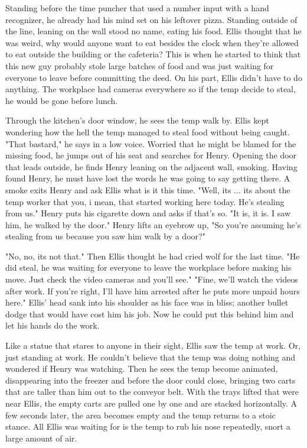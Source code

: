\begin{Document}
        Standing before the time puncher that used a number input with a hand recognizer, he already had his mind set on his leftover pizza. Standing outside of
    the line, leaning on the wall stood no name, eating his food. Ellis thought that he was weird, why would anyone want to eat besides the clock when they're
    allowed to eat outside the building or the cafeteria? This is when he started to think that this new guy probably stole large batches of food and was just
    waiting for everyone to leave before committing the deed. On his part, Ellis didn't have to do anything. The workplace had cameras everywhere so if the
    temp decide to steal, he would be gone before lunch.

        Through the kitchen's door window, he sees the temp walk by. Ellis kept wondering how the hell the temp managed to steal food without being caught. "That
    bastard," he says in a low voice. Worried that he might be blamed for the missing food, he jumps out of his seat and searches for Henry. Opening the door
    that leads outside, he finds Henry leaning on the adjacent wall, smoking. Having found Henry, he must have lost the words he was going to say getting there.
    A smoke exits Henry and ask Ellis what is it this time. "Well, its ... its about the temp worker that you, i mean, that started working here today. He's
    stealing from us." Henry puts his cigarette down and asks if that's so. "It is, it is. I saw him, he walked by the door." Henry lifts an eyebrow up, "So
    you're assuming he's stealing from us because you saw him walk by a door?"

        "No, no, its not that." Then Ellis thought he had cried wolf for the last time. "He did steal, he was waiting for everyone to leave the workplace before
    making his move. Just check the video cameras and you'll see." "Fine, we'll watch the videos after work. If you're right, I'll have him arrested after he
    puts more unpaid hours here." Ellis' head sank into his shoulder as his face was in bliss; another bullet dodge that would have cost him his job. Now he
    could put this behind him and let his hands do the work.

       Like a statue that stares to anyone in their sight, Ellis saw the temp at work. Or, just standing at work. He couldn't believe that the temp was doing
    nothing and wondered if Henry was watching. Then he sees the temp become animated, disappearing into the freezer and before the door could close, bringing
    two carts that are taller than him out to the conveyor belt. With the trays lifted that were near Ellis, the empty carts are pulled one by one and are
    stacked horizontally. A few seconds later, the area becomes empty and the temp returns to a stoic stance. All Ellis was waiting for is the temp to rub
    his nose repeatedly, snort a large amount of air.


\end{Document}
